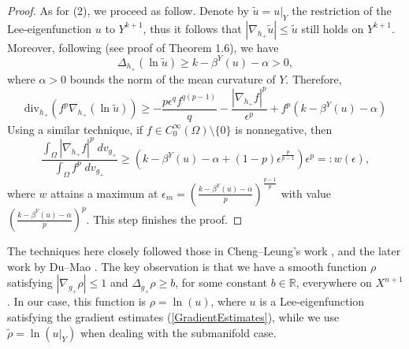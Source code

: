 \documentclass{amsart}
\newcommand{\Div}{\text{div}}
\begin{document}
\begin{proof}
    As for (2), we proceed as follow. Denote by $\tilde u = u|_Y$ the restriction of the Lee-eigenfunction $u$ to $Y^{k+1}$, thus it follows that $|\nabla_{h_+}\tilde u| \le \tilde u$ still holds on $Y^{k+1}$. Moreover, following \cite{Perez-AyalaSamuel2025HaCc} (see proof of Theorem 1.6), we have
    \begin{equation}\label{InducedLaplacian}
        \Delta_{h_+}(\ln \tilde u) \ge k - \beta^Y(u) - \alpha>0,
    \end{equation}
    where $\alpha>0$ bounds the norm of the mean curvature of $Y$. Therefore,
    \begin{equation}
        \Div_{h_+}(f^p \nabla_{h_+}(\ln \tilde u)) \ge -\frac{p\epsilon^qf^{q(p - 1)}}{q} - \frac{|\nabla_{h_+}f|^p}{\epsilon^p} + f^p(k - \beta^Y(u) - \alpha)
    \end{equation}
    Using a similar technique, if $f\in C^\infty_0(\Omega)\setminus\{0\}$ is nonnegative, then
    \[
        \frac{\displaystyle\int_\Omega |\nabla_{h_+}f|^p\;dv_{g_+}}{\displaystyle\int_\Omega f^p\;dv_{g_+}} \ge \left(k-\beta^Y(u)-\alpha + (1-p)\epsilon^{\frac{p}{p-1}}\right)\epsilon^p =: w(\epsilon),
    \]
    where $w$ attains a maximum at $\epsilon_m = \left(\frac{k-\beta^Y(u) - \alpha}{p}\right)^{\frac{p-1}{p}}$ with value $\left(\frac{k-\beta^Y(u) - \alpha}{p}\right)^p$. This step finishes the proof.
\end{proof}

The techniques here closely followed those in Cheng--Leung's work \cite{CheungLeung-Fu2001Eefs}, and the later work by Du--Mao \cite{DuMao}. The key observation is that we have a smooth function $\rho$ satisfying $|\nabla_{g_+}\rho|\le 1$ and $\Delta_{g_+}\rho\ge b$, for some constant $b\in \mathbb{R}$,  everywhere on $X^{n+1}$. In our case, this function is $\rho = \ln(u)$, where $u$ is a Lee-eigenfunction satisfying the gradient estimates (\ref{GradientEstimates}), while we use $\tilde \rho = \ln(u|_Y)$ when dealing with the submanifold case. 
\end{document}
